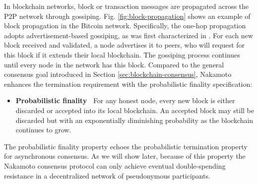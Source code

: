 In blockchain networks, block or transaction messages are propagated across the P2P network through gossiping. Fig. \ref{fig:block-propagation} shows an example of block propagation in the Bitcoin network. Specifically, the one-hop propagation adopts advertisement-based gossiping, as was first characterized in . For each new block received and validated, a node advertises it to peers, who will request for this block if it extends their local blockchain. The gossiping process continues until every node in the network has this block. 
Compared to the general consensus goal introduced in Section \ref{sec:blockchain-consensus}, Nakamoto enhances the termination requirement with the probabilistic finality specification:
\begin{itemize}
    \item \textbf{Probabilistic finality~} For any honest node, every new block is either discarded or accepted into its local blockchain. An accepted block may still be discarded but with an exponentially diminishing probability as the blockchain continues to grow.
\end{itemize}
The probabilistic finality property echoes the probabilistic termination property for asynchronous consensus. As we will show later, because of this property the Nakamoto consensus protocol can only achieve eventual double-spending resistance in a decentralized network of pseudonymous participants.


